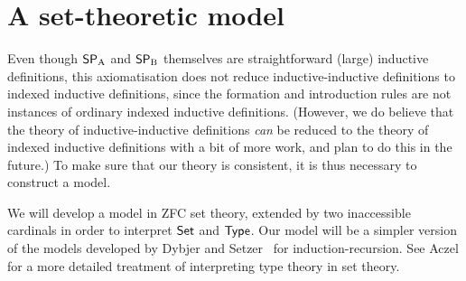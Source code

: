 \documentclass{article}
\begin{document}
\begin{description}










\end{description}

\section{A set-theoretic model}
\label{sec:model}

Even though $\mathsf{SP}_{\mathrm{A}}$ and $\mathsf{SP}_{\mathrm{B}}$ themselves are straightforward (large)
inductive definitions, this axiomatisation does not reduce
inductive-inductive definitions to indexed inductive definitions,
since the formation and introduction rules are not instances of
ordinary indexed inductive definitions.  (However, we do believe that
the theory of inductive-inductive definitions \emph{can} be reduced to
the theory of indexed inductive definitions with a bit of more
work, and plan to do this in the future.) %
To make sure that our theory is consistent, it is thus necessary to
construct a model.


We will develop a model in ZFC set theory, extended by two
inaccessible cardinals in order to interpret $\mathsf{Set}$ and $\mathsf{Type}$.  Our
model will be a simpler version of the models developed by Dybjer and
Setzer~\cite{dybjersetzer1999finax,dybjersetzer2006IIR} for
induction-recursion. %
See Aczel \cite{aczel1999typesandsets} for a more detailed treatment
of interpreting type theory in set theory.
\end{document}
